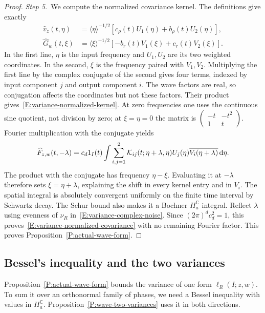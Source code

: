\begin{proof}
  \medskip
  \noindent\textit{Step 5.~}We compute the normalized covariance kernel.
  The definitions give exactly
  \begin{align*}
    \widehat{v}_z(t,\eta)
    &= \langle\eta\rangle^{-1/2}
    [c_\rho(t)U_1(\eta)+b_\rho(t)U_2(\eta)],\\
    \widehat{G}_w(t,\xi)
    &= \langle\xi\rangle^{-1/2}
    [-b_r(t)V_1(\xi)+c_r(t)V_2(\xi)].
  \end{align*}
  In the first line, $\eta$ is the input frequency and $U_1,U_2$ are its two
  weighted coordinates. In the second, $\xi$ is the frequency paired with
  $V_1,V_2$. Multiplying the first line by the complex conjugate of the second
  gives four terms, indexed by input component $j$ and output component $i$.
  The wave factors are real, so conjugation affects the coordinates but not
  these factors.
  Their product gives~\eqref{E:variance-normalized-kernel}. At zero frequencies
  one uses the continuous sine quotient, not division by zero; at $\xi = \eta =
  0$ the matrix is
  $\left(\begin{smallmatrix}-t&-t^2\\1&t\end{smallmatrix}\right)$. Fourier
  multiplication with the conjugate yields
  \[
    \widehat{F}_{z,w}(t,-\lambda)
    = c_d1_I(t)\int\sum_{i,j=1}^2\mathcal{K}_{ij}(t;\eta+\lambda,\eta)
    U_j(\eta)\overline{V_i(\eta+\lambda)}\,\mathrm{d}\eta.
  \]
  The product with the conjugate has frequency $\eta-\xi$. Evaluating it at
  $-\lambda$ therefore sets $\xi = \eta+\lambda$, explaining the shift in
  every kernel entry and in $V_i$.
  The spatial integral is absolutely convergent uniformly on the finite time
  interval by Schwartz decay. The Schur bound also makes it a Bochner
  $H_a^{\mathbb{C}}$ integral. Reflect $\lambda$ using evenness of $\nu_R$
  in~\eqref{E:variance-complex-noise}. Since $(2\pi)^dc_d^2 = 1$, this
  proves~\eqref{E:variance-normalized-covariance} with no remaining Fourier
  factor. This proves Proposition~\ref{P:actual-wave-form}.
\end{proof}

\subsection{Bessel's inequality and the two variances}

Proposition~\ref{P:actual-wave-form} bounds the variance of one form
$\ell_R(I;z,w)$. To sum it over an orthonormal family of phases, we need a
Bessel inequality with values in $H_a^{\mathbb{C}}$.
Proposition~\ref{P:wave-two-variances} uses it in both directions.

